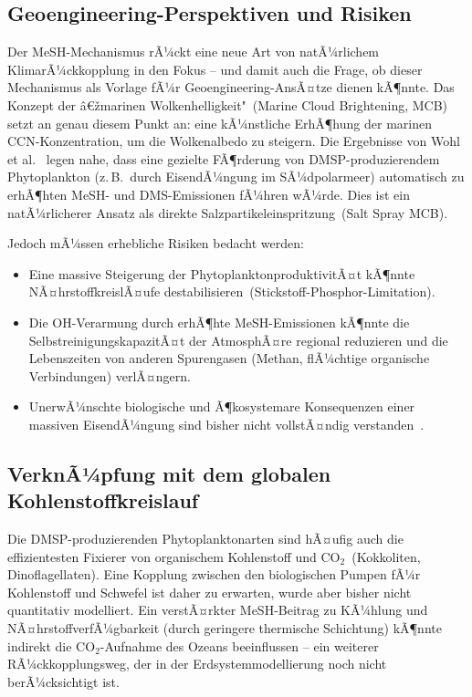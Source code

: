 ﻿\documentclass[a4paper,12pt]{article}
\theoremstyle{definition}
\begin{document}
\subsection{Geoengineering-Perspektiven und Risiken}

Der MeSH-Mechanismus rÃ¼ckt eine neue Art von natÃ¼rlichem KlimarÃ¼ckkopplung in den Fokus -- und
damit auch die Frage, ob dieser Mechanismus als Vorlage fÃ¼r Geoengineering-AnsÃ¤tze dienen kÃ¶nnte.
Das Konzept der â€žmarinen Wolkenhelligkeit"~(Marine Cloud Brightening, MCB) setzt an genau diesem
Punkt an: eine kÃ¼nstliche ErhÃ¶hung der marinen CCN-Konzentration, um die Wolkenalbedo zu steigern.
Die Ergebnisse von Wohl et al.~\cite{wohl2024} legen nahe, dass eine gezielte FÃ¶rderung von
DMSP-produzierendem Phytoplankton (z.\,B.\ durch EisendÃ¼ngung im SÃ¼dpolarmeer) automatisch zu
erhÃ¶hten MeSH- und DMS-Emissionen fÃ¼hren wÃ¼rde. Dies ist ein natÃ¼rlicherer Ansatz als direkte
Salzpartikeleinspritzung~(Salt Spray MCB).

Jedoch mÃ¼ssen erhebliche Risiken bedacht werden:
\begin{itemize}
  \item Eine massive Steigerung der PhytoplanktonproduktivitÃ¤t kÃ¶nnte NÃ¤hrstoffkreislÃ¤ufe
        destabilisieren~(Stickstoff-Phosphor-Limitation).
  \item Die OH-Verarmung durch erhÃ¶hte MeSH-Emissionen kÃ¶nnte die SelbstreinigungskapazitÃ¤t
        der AtmosphÃ¤re regional reduzieren und die Lebenszeiten von anderen Spurengasen
        (Methan, flÃ¼chtige organische Verbindungen) verlÃ¤ngern.
  \item UnerwÃ¼nschte biologische und Ã¶kosystemare Konsequenzen einer massiven EisendÃ¼ngung
        sind bisher nicht vollstÃ¤ndig verstanden~\cite{boyd2000}.
\end{itemize}

\subsection{VerknÃ¼pfung mit dem globalen Kohlenstoffkreislauf}

Die DMSP-produzierenden Phytoplanktonarten sind hÃ¤ufig auch die effizientesten Fixierer von
organischem Kohlenstoff und CO$_2$~(Kokkoliten, Dinoflagellaten). Eine Kopplung zwischen den
biologischen Pumpen fÃ¼r Kohlenstoff und Schwefel ist daher zu erwarten, wurde aber bisher nicht
quantitativ modelliert. Ein verstÃ¤rkter MeSH-Beitrag zu KÃ¼hlung und NÃ¤hrstoffverfÃ¼gbarkeit
(durch geringere thermische Schichtung) kÃ¶nnte indirekt die CO$_2$-Aufnahme des Ozeans beeinflussen
-- ein weiterer RÃ¼ckkopplungsweg, der in der Erdsystemmodellierung noch nicht berÃ¼cksichtigt ist.
\end{document}
